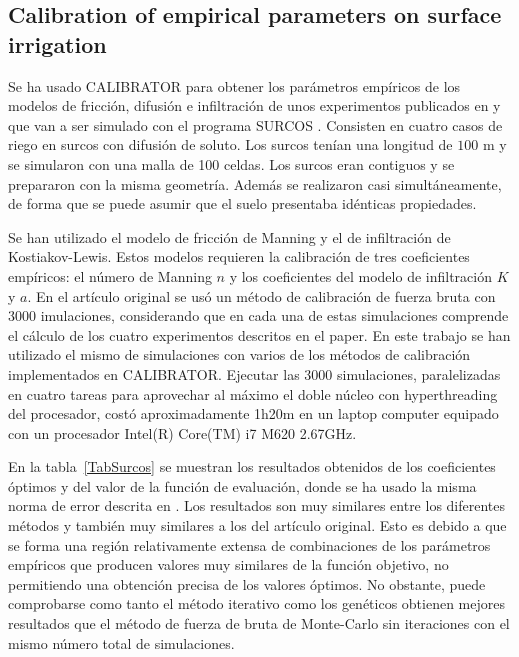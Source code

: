 \documentclass[review,authoryear]{elsarticle}
\begin{document}
\subsection{Calibration of empirical parameters on surface irrigation}

Se ha usado CALIBRATOR para obtener los parámetros empíricos de los modelos de
fricción, difusión e infiltración de unos experimentos publicados en
\citet{JaviSurcos2} y que van a ser simulado con el programa SURCOS
\citep{Surcos,SurcosGit,JaviSurcos3}. Consisten en cuatro casos de riego en
surcos con difusión de soluto. Los surcos tenían una longitud de $100$ m y se simularon con una malla de 100 celdas. Los surcos eran contiguos y se prepararon
con la misma geometría. Además se realizaron casi simultáneamente, de forma que
se puede asumir que el suelo presentaba idénticas propiedades.

Se han utilizado el modelo de fricción de Manning y el de infiltración de
Kostiakov-Lewis. Estos modelos requieren la calibración de tres coeficientes
empíricos: el número de Manning $n$ y los coeficientes del modelo de
infiltración $K$ y $a$. En el artículo original se usó un método de calibración
de fuerza bruta con 3000  imulaciones, considerando que en cada una de estas
simulaciones comprende el cálculo de los cuatro experimentos descritos en el
paper. En este trabajo se han utilizado el mismo de simulaciones con varios de
los métodos de calibración implementados en CALIBRATOR. Ejecutar las 3000
simulaciones, paralelizadas en cuatro tareas para aprovechar al máximo el doble
núcleo con hyperthreading del procesador, costó aproximadamente 1h20m en un
laptop computer equipado con un procesador Intel(R) Core(TM) i7 M620 2.67GHz.

En la tabla~\ref{TabSurcos} se muestran los resultados obtenidos de los
coeficientes óptimos y del valor de la función de evaluación,
donde se ha usado la misma norma de error descrita en \citet{JaviSurcos2}. Los
resultados son muy similares entre los diferentes métodos y también muy
similares a los del artículo original. Esto es debido a que se forma una región
relativamente extensa de combinaciones de los parámetros empíricos que producen
valores muy similares de la función objetivo, no permitiendo una obtención
precisa de los valores óptimos. No obstante, puede comprobarse como tanto el
método iterativo como los genéticos obtienen mejores resultados que el método de
fuerza de bruta de Monte-Carlo sin iteraciones con el mismo número total de
simulaciones.
\end{document}
